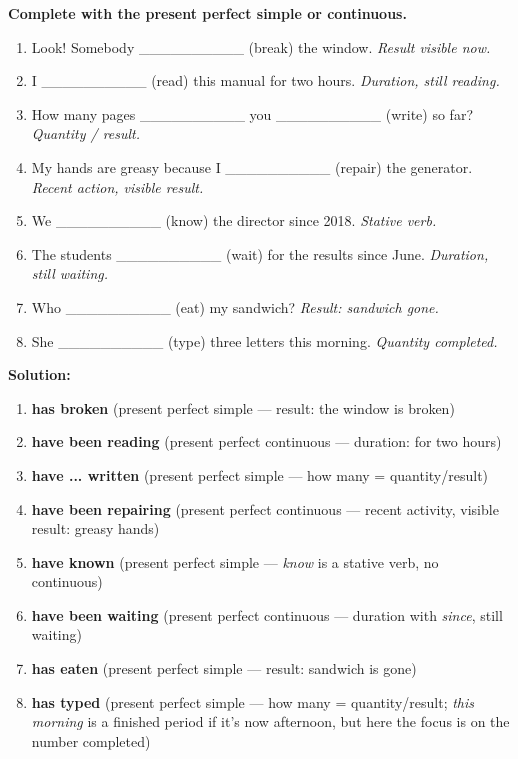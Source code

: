 \documentclass[11pt]{article}
\begin{document}
\begin{exoresolu}
\textbf{Complete with the present perfect simple or continuous.}
\begin{enumerate}
    \item Look! Somebody \_\_\_\_\_\_\_\_\_\_ (break) the window. \emph{Result visible now.}
    \item I \_\_\_\_\_\_\_\_\_\_ (read) this manual for two hours. \emph{Duration, still reading.}
    \item How many pages \_\_\_\_\_\_\_\_\_\_ you \_\_\_\_\_\_\_\_\_\_ (write) so far? \emph{Quantity / result.}
    \item My hands are greasy because I \_\_\_\_\_\_\_\_\_\_ (repair) the generator. \emph{Recent action, visible result.}
    \item We \_\_\_\_\_\_\_\_\_\_ (know) the director since 2018. \emph{Stative verb.}
    \item The students \_\_\_\_\_\_\_\_\_\_ (wait) for the results since June. \emph{Duration, still waiting.}
    \item Who \_\_\_\_\_\_\_\_\_\_ (eat) my sandwich? \emph{Result: sandwich gone.}
    \item She \_\_\_\_\_\_\_\_\_\_ (type) three letters this morning. \emph{Quantity completed.}
\end{enumerate}
\tcblower
\textbf{Solution:}
\begin{enumerate}
    \item \textbf{has broken} (present perfect simple — result: the window is broken)
    \item \textbf{have been reading} (present perfect continuous — duration: for two hours)
    \item \textbf{have ... written} (present perfect simple — how many = quantity/result)
    \item \textbf{have been repairing} (present perfect continuous — recent activity, visible result: greasy hands)
    \item \textbf{have known} (present perfect simple — \emph{know} is a stative verb, no continuous)
    \item \textbf{have been waiting} (present perfect continuous — duration with \emph{since}, still waiting)
    \item \textbf{has eaten} (present perfect simple — result: sandwich is gone)
    \item \textbf{has typed} (present perfect simple — how many = quantity/result; \emph{this morning} is a finished period if it's now afternoon, but here the focus is on the number completed)
\end{enumerate}
\end{exoresolu}
\end{document}

